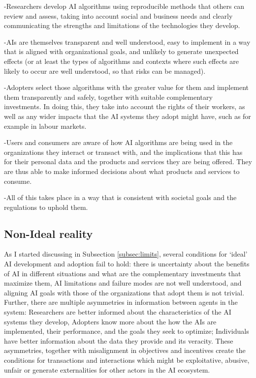\documentclass[11pt]{article}
\begin{document}
-Researchers develop AI algorithms using reproducible methods that others can review and assess, taking into account social and business needs and clearly communicating the strengths and limitations of the technologies they develop. 

-AIs are themselves transparent and well understood, easy to implement in a way that is aligned with organizational goals, and unlikely to generate unexpected effects (or at least the types of algorithms and contexts where such effects are likely to occur are well understood, so that risks can be managed). 

-Adopters select those algorithms with the greater value for them and implement them transparently and safely, together with suitable complementary investments. In doing this, they take into account the rights of their workers, as well as any wider impacts that the AI systems they adopt might have, such as for example in labour markets. 

-Users and consumers are aware of how AI algorithms are being used in the organizations they interact or transact with, and the implications that this has for their personal data and the products and services they are being offered.  They are thus able to make informed decisions about what products and services to consume. 

-All of this takes place in a way that is consistent with societal goals and the regulations to uphold them. 

\subsection{Non-Ideal reality}
\label{subsec:non_ideal}
As I started discussing in Subsection \ref{subsec:limits}, several conditions for `ideal' AI development and adoption fail to hold: there is uncertainty about the benefits of AI in different situations and what are the complementary investments that maximize them, AI limitations and failure modes are not well understood, and aligning AI goals with those of the organizations that adopt them is not trivial. Further, there are multiple asymmetries in information between agents in the system: Researchers are better informed about the characteristics of the AI systems they develop, Adopters know more about the how the AIs are implemented, their performance, and the goals they seek to optimize; Individuals have better information about the data they provide and its veracity. These asymmetries, together with misalignment in objectives and incentives create the conditions for transactions and interactions which might be exploitative, abusive, unfair or generate externalities for other actors in the AI ecosystem. 
\end{document}
